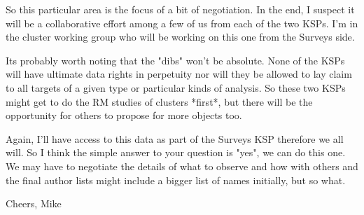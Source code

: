 \documentclass[11pt]{article}
\begin{document}
So this particular area is the focus of a bit of negotiation. In the
end, I suspect it will be a collaborative effort among a few of us
from each of the two KSPs. I'm in the cluster working group who will
be working on this one from the Surveys side.

Its probably worth noting that the "dibs" won't be absolute. None of
the KSPs will have ultimate data rights in perpetuity nor will they be
allowed to lay claim to all targets of a given type or particular
kinds of analysis. So these two KSPs might get to do the RM studies of
clusters *first*, but there will be the opportunity for others to
propose for more objects too.

Again, I'll have access to this data as part of the Surveys KSP
therefore we all will. So I think the simple answer to your question
is "yes", we can do this one. We may have to negotiate the details of
what to observe and how with others and the final author lists might
include a bigger list of names initially, but so what.

Cheers,
Mike



 
\end{document}
